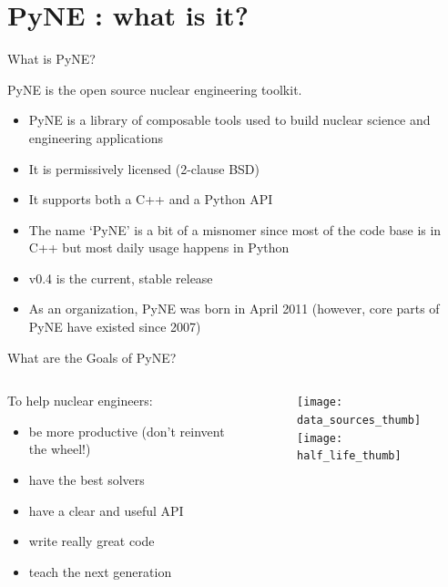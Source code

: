 \documentclass[xcolor=x11names,compress]{beamer}
\renewcommand{\(}{\begin{columns}}
\renewcommand{\)}{\end{columns}}
\newcommand{\<}[1]{\begin{column}{#1}}
\renewcommand{\>}{\end{column}}
\begin{document}
\section{PyNE \cite{pyne}: what is it?}
\begin{frame}{What is PyNE?}

    PyNE is \textcolor{dgreen}{the} open source nuclear engineering toolkit.
    \vspace*{1em}
    \begin{itemize}
    \item PyNE is a \textcolor{dgreen}{library of composable tools} used to build 
    nuclear science and engineering applications
    \item It is \textcolor{dgreen}{permissively licensed} (2-clause BSD)
    \item It supports both a \textcolor{dgreen}{C++} and a \textcolor{dgreen}{Python} API
    \item The name `PyNE' is a bit of a misnomer since most of the code 
    base is in C++ but most daily usage happens in Python
    \item \textcolor{dgreen}{v0.4} is the current, stable release
    \item As an organization, PyNE was born in April 2011 
    (however, core parts of PyNE have existed since 2007)
    \end{itemize}

\end{frame}

\begin{frame}{What are the Goals of PyNE?}

    \begin{columns}
    \begin{column}{0.45\textwidth}
        To help nuclear engineers:
        \begin{itemize}
        \item be more \textcolor{dgreen}{productive} (don't reinvent the wheel!)
        \item have the best \textcolor{dgreen}{solvers}
        \item have a clear and useful \textcolor{dgreen}{API}
        \item write really great code
        \item \textcolor{dgreen}{teach} the next generation
        \end{itemize}
  	\end{column}
 	\begin{column}{0.45\textwidth}
 	   \begin{center}
 	   \begin{figure}
 	   \texttt{[image: data\_sources\_thumb]}  \\
       \texttt{[image: half\_life\_thumb]}
	   \end{figure}
 	   \end{center}
  	\end{column}
	\end{columns}

\end{frame}
\end{document}
